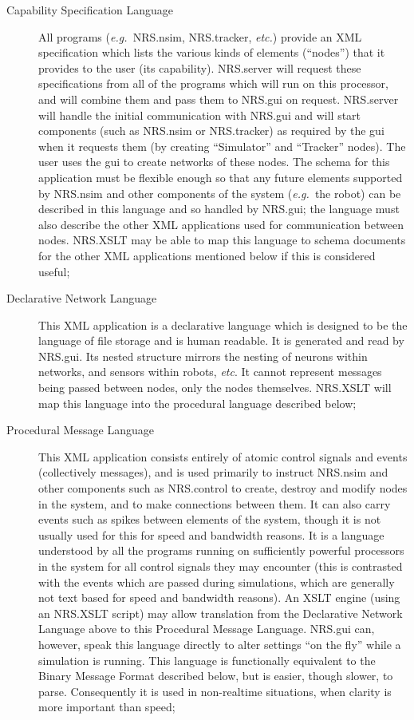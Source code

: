 \documentclass[pdftex,a4paper]{article}
\newcommand{\eg}{{\em e.g.\ }}
\newcommand{\etc}{{\it etc.}}
\newcommand{\et}{{\it etc}}
\begin{document}
\begin{description}

\item[Capability Specification Language] All programs (\eg NRS.nsim,
  NRS.tracker, \etc) provide an XML specification which lists the
  various kinds of elements (``nodes'') that it provides to the user
  (its capability). NRS.server will request these specifications from
  all of the programs which will run on this processor, and will
  combine them and pass them to NRS.gui on request. NRS.server will
  handle the initial communication with NRS.gui and will start
  components (such as NRS.nsim or NRS.tracker) as required by the gui
  when it requests them (by creating ``Simulator'' and ``Tracker''
  nodes). The user uses the gui to create networks of these nodes. The
  schema for this application must be flexible enough so that any
  future elements supported by NRS.nsim and other components of the
  system (\eg the robot) can be described in this language and so
  handled by NRS.gui; the language must also describe the other XML
  applications used for communication between nodes. NRS.XSLT may be
  able to map this language to schema documents for the other XML
  applications mentioned below if this is considered useful;

\item[Declarative Network Language] This XML application is a
  declarative language which is designed to be the language of file
  storage and is human readable. It is generated and read by
  NRS.gui. Its nested structure mirrors the nesting of neurons within
  networks, and sensors within robots, \et. It cannot represent
  messages being passed between nodes, only the nodes
  themselves. NRS.XSLT will map this language into the procedural
  language described below;

\item[Procedural Message Language] This XML application consists
  entirely of atomic control signals and events (collectively
  messages), and is used primarily to instruct NRS.nsim and other
  components such as NRS.control to create, destroy and modify nodes
  in the system, and to make connections between them. It can also
  carry events such as spikes between elements of the system, though
  it is not usually used for this for speed and bandwidth reasons. It
  is a language understood by all the programs running on sufficiently
  powerful processors in the system for all control signals they may
  encounter (this is contrasted with the events which are passed
  during simulations, which are generally not text based for speed and
  bandwidth reasons). An XSLT engine (using an NRS.XSLT script) may
  allow translation from the Declarative Network Language above to
  this Procedural Message Language. NRS.gui can, however, speak this
  language directly to alter settings ``on the fly'' while a
  simulation is running. This language is functionally equivalent to
  the Binary Message Format described below, but is easier, though
  slower, to parse. Consequently it is used in non-realtime
  situations, when clarity is more important than speed;


\end{description}
\end{document}
